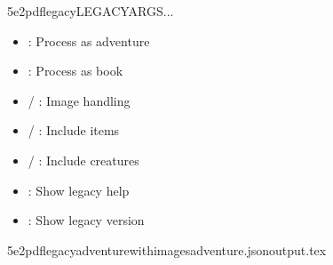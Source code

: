 \documentclass[letterpaper,10pt,english]{sphinxmanual}
\begin{document}
\begin{sphinxVerbatim}[commandchars=\\\{\}]
5e2pdflegacy\PYG{o}{[}LEGACY\PYGZus{}ARGS...\PYG{o}{]}
\end{sphinxVerbatim}

\sphinxAtStartPar
{}
\begin{itemize}
\item {} 
\sphinxAtStartPar
{}: Process as adventure

\item {} 
\sphinxAtStartPar
{}: Process as book

\item {} 
\sphinxAtStartPar
{} / : Image handling

\item {} 
\sphinxAtStartPar
{} / : Include items

\item {} 
\sphinxAtStartPar
{} / : Include creatures

\item {} 
\sphinxAtStartPar
{}: Show legacy help

\item {} 
\sphinxAtStartPar
{}: Show legacy version

\end{itemize}

\sphinxAtStartPar
{}

\begin{sphinxVerbatim}[commandchars=\\\{\}]
5e2pdflegacy\PYGZhy{}\PYGZhy{}adventure\PYGZhy{}\PYGZhy{}with\PYGZhy{}imagesadventure.json\PYGZgt{}output.tex
\end{sphinxVerbatim}
\end{document}
